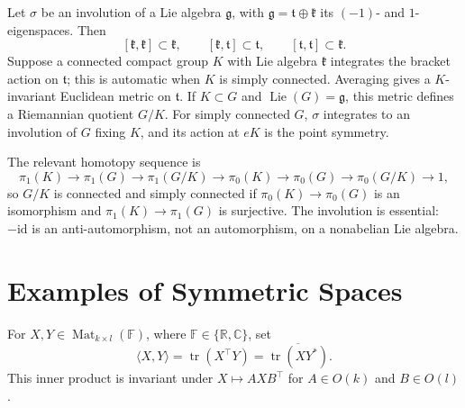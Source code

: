 \begin{remark}
  \label{rem:pet-ch10-symmetric-space-from-involution}
  Let $\sigma$ be an involution of a Lie algebra $\mathfrak g$, with
  $\mathfrak g=\mathfrak t\oplus\mathfrak k$ its $(-1)$- and $1$-eigenspaces.
  Then
  \[
    [\mathfrak k,\mathfrak k]\subset\mathfrak k,\qquad
    [\mathfrak k,\mathfrak t]\subset\mathfrak t,\qquad
    [\mathfrak t,\mathfrak t]\subset\mathfrak k.
  \]
  Suppose a connected compact group $K$ with Lie algebra $\mathfrak k$
  integrates the bracket action on $\mathfrak t$; this is automatic when $K$
  is simply connected. Averaging gives a $K$-invariant Euclidean metric on
  $\mathfrak t$. If $K\subset G$ and $\operatorname{Lie}(G)=\mathfrak g$, this
  metric defines a Riemannian quotient $G/K$. For simply connected $G$,
  $\sigma$ integrates to an involution of $G$ fixing $K$, and its action at
  $eK$ is the point symmetry.

  The relevant homotopy sequence is
  \[
    \pi_1(K)\to\pi_1(G)\to\pi_1(G/K)\to\pi_0(K)\to\pi_0(G)\to\pi_0(G/K)\to1,
  \]
  so $G/K$ is connected and simply connected if
  $\pi_0(K)\to\pi_0(G)$ is an isomorphism and
  $\pi_1(K)\to\pi_1(G)$ is surjective. The involution is essential:
  $-\mathrm{id}$ is an anti-automorphism, not an automorphism, on a nonabelian
  Lie algebra.
\end{remark}

\section{Examples of Symmetric Spaces}

For $X,Y\in\operatorname{Mat}_{k\times l}(\mathbb F)$, where
$\mathbb F\in\{\mathbb R,\mathbb C\}$, set
\[
  \langle X,Y\rangle=\operatorname{tr}(X^\top Y)
  =\overline{\operatorname{tr}(XY^*)}.
\]
This inner product is invariant under $X\mapsto AXB^\top$ for $A\in O(k)$ and
$B\in O(l)$.


